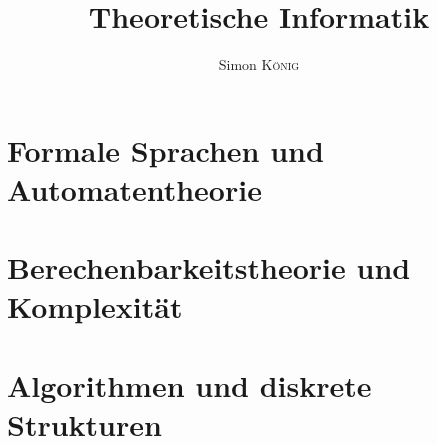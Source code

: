 \documentclass[orange, ngerman]{../LaTeX-Templates/Skript/skript}
\title{Theoretische Informatik\\\subtitleformat{Kurzzusammenfassung zur theoretischen Informatik}}
\author{Simon \textsc{König}}
\begin{document}
\maketitle
\tableofcontents





\renewcommand{\prtname}{Theoretische Informatik}

\part{Formale Sprachen und Automatentheorie}
	
	
	
	
	
	

\part{Berechenbarkeitstheorie und Komplexität}
	
	
	
	
	

\part{Algorithmen und diskrete Strukturen}
	
\end{document}
